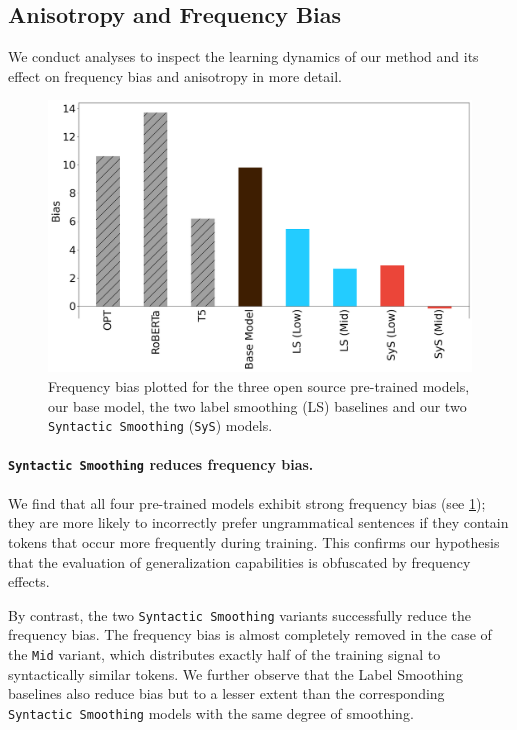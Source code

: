 \subsection{Anisotropy and Frequency Bias}
We conduct analyses to inspect the learning dynamics of our method and its effect on frequency bias and anisotropy in more detail. 
\begin{figure}[ht!]
    \centering
    \includegraphics[width=0.90\linewidth]{chapters/syntatic-smoothing/figures/biases.png}
    \caption{Frequency bias plotted for the three open source pre-trained models, our base model, the two label smoothing (LS) baselines and our two \texttt{Syntactic Smoothing} (\texttt{SyS}) models.}
    \label{fig:biases}
    \vspace{-1em}
\end{figure}

\paragraph{\texttt{Syntactic Smoothing} reduces frequency bias.}
We find that all four pre-trained models exhibit strong frequency bias (see \cref{fig:biases}); they are more likely to incorrectly prefer ungrammatical sentences if they contain tokens that occur more frequently during training. This confirms our hypothesis that the evaluation of generalization capabilities is obfuscated by frequency effects. 

By contrast, the two \texttt{Syntactic Smoothing} variants successfully reduce the frequency bias. The frequency bias is almost completely removed in the case of the \texttt{Mid} variant, which distributes exactly half of the training signal to syntactically similar tokens. We further observe that the Label Smoothing baselines also reduce bias but to a lesser extent than the corresponding \texttt{Syntactic Smoothing} models with the same degree of smoothing. 

